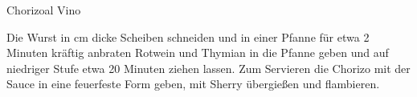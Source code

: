 \begin{recipe}{Chorizo}{al Vino}\label{Chorizo}
  \inglist

  \steps

  Die Wurst in \halb cm dicke Scheiben schneiden und in einer Pfanne für etwa
  2 Minuten kräftig anbraten Rotwein und Thymian in die Pfanne geben und auf
  niedriger Stufe etwa 20 Minuten ziehen lassen. Zum Servieren die Chorizo
  mit der Sauce in eine feuerfeste Form geben, mit Sherry übergießen und
  flambieren.
  
\end{recipe}
